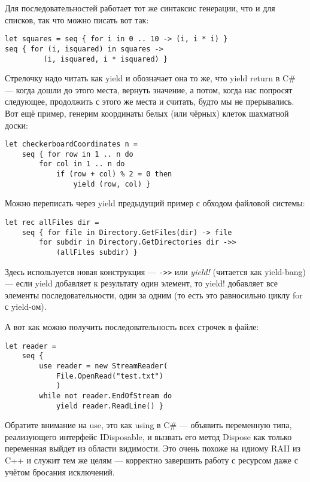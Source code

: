 \documentclass{../../text-style}
\begin{document}
Для последовательностей работает тот же синтаксис генерации, что и для списков, так что можно писать вот так:

\begin{verbatim}
let squares = seq { for i in 0 .. 10 -> (i, i * i) }
seq { for (i, isquared) in squares -> 
         (i, isquared, i * isquared) }
\end{verbatim}

Стрелочку надо читать как yield и обозначает она то же, что yield return в C\# --- когда дошли до этого места, вернуть значение, а потом, когда нас попросят следующее, продолжить с этого же места и считать, будто мы не прерывались. Вот ещё пример, генерим координаты белых (или чёрных) клеток шахматной доски:

\begin{verbatim}
let checkerboardCoordinates n =
    seq { for row in 1 .. n do
        for col in 1 .. n do
            if (row + col) % 2 = 0 then
                yield (row, col) }
\end{verbatim}

Можно переписать через yield предыдущий пример с обходом файловой системы:

\begin{verbatim}
let rec allFiles dir =
    seq { for file in Directory.GetFiles(dir) -> file
        for subdir in Directory.GetDirectories dir ->> 
            (allFiles subdir) }
\end{verbatim}

Здесь используется новая конструкция --- \verb|->>| или \textit{yield!} (читается как yield-bang) --- если yield добавляет к результату один элемент, то yield! добавляет все элементы последовательности, один за одним (то есть это равносильно циклу for с yield-ом).

А вот как можно получить последовательность всех строчек в файле:

\begin{verbatim}
let reader =
    seq { 
        use reader = new StreamReader(
            File.OpenRead("test.txt")
            )
        while not reader.EndOfStream do
            yield reader.ReadLine() }
\end{verbatim}

Обратите внимание на use, это как using в C\# --- объявить переменную типа, реализующего интерфейс IDisposable, и вызвать его метод Dispose как только переменная выйдет из области видимости. Это очень  похоже на идиому RAII из C++ и служит тем же целям --- корректно завершить работу с ресурсом даже с учётом бросания исключений.
\end{document}
